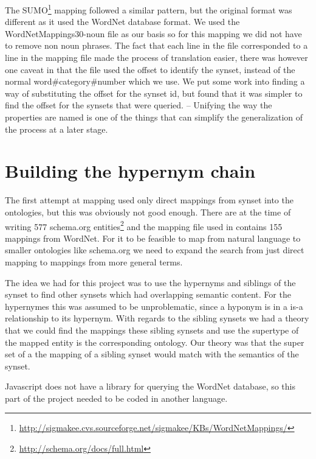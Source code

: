 The SUMO\footnote{\url{http://sigmakee.cvs.sourceforge.net/sigmakee/KBs/WordNetMappings/}} mapping followed a similar pattern,
but the original format was different as it used the WordNet database format.
We used the WordNetMappings30-noun file as our basis so for this mapping we did not have to remove non noun phrases.
The fact that each line in the file corresponded to a line in the mapping file made the process of translation easier,
there was however one caveat in that the file used the offset to identify the synset,
instead of the normal word\#category\#number which we use.
We put some work into finding a way of substituting the offset for the synset id,
but found that it was simpler to find the offset for the synsets that were queried.
-- Unifying the way the properties are named is one of the things that can simplify the generalization of the process at a later stage.



\section{Building the hypernym chain}
The first attempt at mapping used only direct mappings from synset into the ontologies,
but this was obviously not good enough.
There are at the time of writing 577 schema.org entities\footnote{\url{http://schema.org/docs/full.html}}
and the mapping file used in \theartefact contains 155 mappings from WordNet.
For it to be feasible to map from natural language to smaller ontologies like schema.org we need to expand the search
from just direct mapping to mappings from more general terms.

The idea we had for this project was to use the hypernyms and siblings of the synset to find other synsets
which had overlapping semantic content.
For the hypernymes this was assumed to be unproblematic, since a hyponym is in a is-a relationship to its hypernym.
With regards to the sibling synsets we had a theory that we could find the mappings these sibling synsets
and use the supertype of the mapped entity is the corresponding ontology.
Our theory was that the super set of a the mapping of a sibling synset would match with the semantics of the synset.

Javascript does not have a library for 	querying the WordNet database,
so this part of the project needed to be coded in another language.

